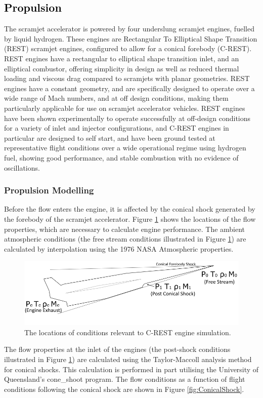 \textcolor{black}{
\subsection{Propulsion}\label{sec:propulsion}
}
\noindent
The scramjet accelerator is powered by four underslung scramjet engines, fuelled by liquid hydrogen. These engines are Rectangular To Elliptical Shape Transition (REST) scramjet engines, configured to allow for a conical forebody (C-REST). REST engines have a rectangular to elliptical shape transition inlet, and an elliptical combustor\cite{Smart1999}, offering simplicity in design as well as reduced thermal loading and viscous drag compared to scramjets with planar geometries\cite{Suraweera2009}.  REST engines have a constant geometry, and are specifically designed to operate over a wide range of Mach numbers, and at off design conditions, making them particularly applicable for use on scramjet accelerator vehicles. REST engines have been shown experimentally to operate successfully at off-design conditions for a variety of inlet and injector configurations\cite{Smart2006,Smart2009b}, and C-REST engines in particular are designed to self start\cite{Smart2012}, and have been ground tested at representative flight conditions over a wide operational regime using hydrogen fuel, showing good performance, and stable combustion with no evidence of oscillations\cite{Whitside,Turner,Barth,Curran}.



\subsubsection{Propulsion Modelling}\label{sec:Propulsion}
Before the flow enters the engine, it is affected by the conical shock generated by the forebody of the scramjet accelerator.
Figure \ref{fig:SPARTANEngineshock} shows the locations of the flow properties, which are necessary to calculate engine performance. The ambient atmospheric conditions (the free stream conditions illustrated in Figure \ref{fig:SPARTANEngineshock}) are calculated by interpolation using the 1976 NASA Atmospheric properties\cite{Administration1976}.
\begin{figure}[ht]
	\centering
	\includegraphics[width=0.7\linewidth]{figures/3_vehicle_design/SPARTANEngineshock}
	\caption{The locations of conditions relevant to C-REST engine simulation. }
	\label{fig:SPARTANEngineshock}
\end{figure}
The flow properties at the inlet of the engines (the post-shock conditions illustrated in Figure \ref{fig:SPARTANEngineshock}) are calculated using the Taylor-Maccoll analysis method for conical shocks\cite{TaylorMaccoll}. This calculation is performed in part utilising the University of Queensland's \textsf{cone\_shoot} program. The flow conditions as a function of flight conditions following the conical shock are shown in Figure \ref{fig:ConicalShock}.  

